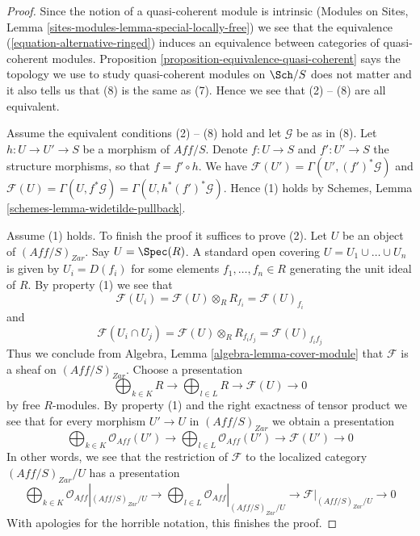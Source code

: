 \begin{proof}
Since the notion of a quasi-coherent module is intrinsic
(Modules on Sites, Lemma \ref{sites-modules-lemma-special-locally-free})
we see that the equivalence (\ref{equation-alternative-ringed})
induces an equivalence between categories of quasi-coherent modules.
Proposition \ref{proposition-equivalence-quasi-coherent}
says the topology we use to study quasi-coherent modules on
$\Sch/S$ does not matter and it also tells us that (8)
is the same as (7). Hence we see that (2) -- (8) are all equivalent.

\medskip\noindent
Assume the equivalent conditions (2) -- (8) hold and let
$\mathcal{G}$ be as in (8). Let $h : U \to U' \to S$ be a morphism
of $\textit{Aff}/S$. Denote $f : U \to S$ and $f' : U' \to S$ the
structure morphisms, so that $f = f' \circ h$.
We have $\mathcal{F}(U') = \Gamma(U', (f')^*\mathcal{G})$ and
$\mathcal{F}(U) = \Gamma(U, f^*\mathcal{G}) = \Gamma(U, h^*(f')^*\mathcal{G})$.
Hence (1) holds by Schemes, Lemma \ref{schemes-lemma-widetilde-pullback}.

\medskip\noindent
Assume (1) holds. To finish the proof it suffices to prove (2).
Let $U$ be an object of $(\textit{Aff}/S)_{Zar}$.
Say $U = \Spec(R)$. A standard open covering $U = U_1 \cup \ldots \cup U_n$
is given by $U_i = D(f_i)$ for some elements $f_1, \ldots, f_n \in R$
generating the unit ideal of $R$. By property (1) we see that
$$
\mathcal{F}(U_i) =
\mathcal{F}(U) \otimes_R R_{f_i} =
\mathcal{F}(U)_{f_i}
$$
and
$$
\mathcal{F}(U_i \cap U_j) =
\mathcal{F}(U) \otimes_R R_{f_if_j} =
\mathcal{F}(U)_{f_if_j}
$$
Thus we conclude from Algebra, Lemma \ref{algebra-lemma-cover-module}
that $\mathcal{F}$ is a sheaf on $(\textit{Aff}/S)_{Zar}$. Choose a
presentation
$$
\bigoplus\nolimits_{k \in K} R
\longrightarrow
\bigoplus\nolimits_{l \in L} R
\longrightarrow
\mathcal{F}(U)
\longrightarrow 0
$$
by free $R$-modules. By property (1) and the right exactness of tensor product
we see that for every morphism $U' \to U$ in $(\textit{Aff}/S)_{Zar}$
we obtain a presentation
$$
\bigoplus\nolimits_{k \in K} \mathcal{O}_{Aff}(U')
\longrightarrow
\bigoplus\nolimits_{l \in L} \mathcal{O}_{Aff}(U')
\longrightarrow
\mathcal{F}(U')
\longrightarrow 0
$$
In other words, we see that the restriction of $\mathcal{F}$
to the localized category $(\textit{Aff}/S)_{Zar}/U$ has a presentation
$$
\bigoplus\nolimits_{k \in K} \mathcal{O}_{Aff}|_{(\textit{Aff}/S)_{Zar}/U}
\longrightarrow
\bigoplus\nolimits_{l \in L} \mathcal{O}_{Aff}|_{(\textit{Aff}/S)_{Zar}/U}
\longrightarrow
\mathcal{F}|_{(\textit{Aff}/S)_{Zar}/U}
\longrightarrow 0
$$
With apologies for the horrible notation, this finishes the proof.
\end{proof}

